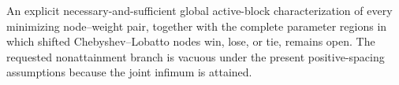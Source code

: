 An explicit necessary-and-sufficient global active-block characterization of every minimizing node--weight pair, together with the complete parameter regions in which shifted Chebyshev--Lobatto nodes win, lose, or tie, remains open.  The requested nonattainment branch is vacuous under the present positive-spacing assumptions because the joint infimum is attained.